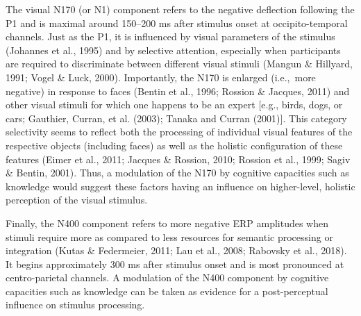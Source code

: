 \documentclass[
  english,
  doc,12pt,twoside,floatsintext]{apa7}
\begin{document}
The visual N170 (or N1) component refers to the negative deflection following the P1 and is maximal around 150--200 ms after stimulus onset at occipito-temporal channels. Just as the P1, it is influenced by visual parameters of the stimulus (Johannes et al., 1995) and by selective attention, especially when participants are required to discriminate between different visual stimuli (Mangun \& Hillyard, 1991; Vogel \& Luck, 2000). Importantly, the N170 is enlarged (i.e.,~more negative) in response to faces (Bentin et al., 1996; Rossion \& Jacques, 2011) and other visual stimuli for which one happens to be an expert {[}e.g., birds, dogs, or cars; Gauthier, Curran, et al. (2003); Tanaka and Curran (2001){]}. This category selectivity seems to reflect both the processing of individual visual features of the respective objects (including faces) as well as the holistic configuration of these features (Eimer et al., 2011; Jacques \& Rossion, 2010; Rossion et al., 1999; Sagiv \& Bentin, 2001). Thus, a modulation of the N170 by cognitive capacities such as knowledge would suggest these factors having an influence on higher-level, holistic perception of the visual stimulus.

Finally, the N400 component refers to more negative ERP amplitudes when stimuli require more as compared to less resources for semantic processing or integration (Kutas \& Federmeier, 2011; Lau et al., 2008; Rabovsky et al., 2018). It begins approximately 300 ms after stimulus onset and is most pronounced at centro-parietal channels. A modulation of the N400 component by cognitive capacities such as knowledge can be taken as evidence for a post-perceptual influence on stimulus processing.
\end{document}
